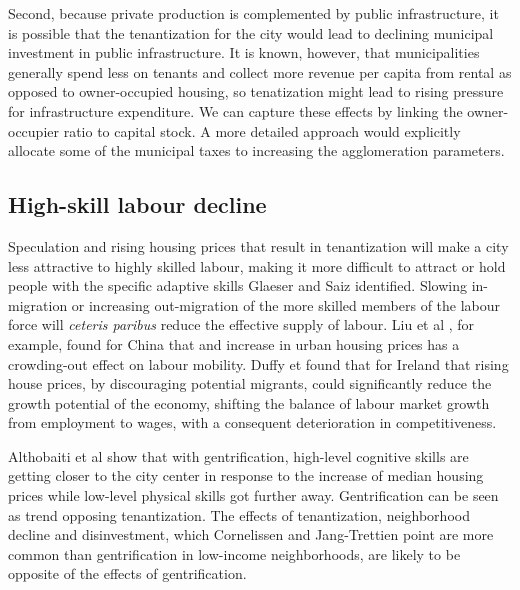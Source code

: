 Second, because private production is complemented by public infrastructure, it is possible that the tenantization for the city would lead to declining municipal investment in public infrastructure. It is known, however, that municipalities generally spend less on tenants and collect more revenue per capita from rental as opposed to owner-occupied housing, so tenatization might lead to rising pressure for infrastructure expenditure.  We can capture these effects by linking the owner-occupier ratio to capital stock. A more detailed approach would explicitly allocate some of the municipal taxes to increasing the agglomeration parameters.


\subsection{High-skill labour decline}

 Speculation and rising housing prices that result in tenantization will make a city less attractive to highly skilled labour, making it more difficult to attract or hold people with the specific adaptive skills Glaeser and Saiz \cite{glaeserRiseSkilledCity2003} identified. Slowing in-migration or increasing out-migration of the more skilled members of the labour force  will \textit{ceteris paribus} reduce the effective supply of labour. 
Liu et al \cite{liuImpactUrbanHousing2023}, for example, found for China that and increase in urban housing prices has a crowding-out effect on labour mobility.  Duffy et  \cite{duffyRisingHousePrices2005} found that for Ireland that rising house prices, by discouraging potential migrants, could significantly reduce the growth potential of the economy, shifting the balance of labour market growth from employment to wages, with a consequent deterioration in competitiveness. %

Althobaiti et al \cite{althobaitiHousingPricesSkills2021}  show that with gentrification, high-level cognitive skills are getting closer to the city center in response to the increase of median housing prices while low-level physical skills got further away.  Gentrification can be seen as trend opposing tenantization. The effects of tenantization, neighborhood decline and disinvestment, which Cornelissen and Jang-Trettien \cite{cornelissenHousingContextNeighborhood2023} point  are more common than gentrification in low-income neighborhoods, are likely to be opposite of the effects of  gentrification.

